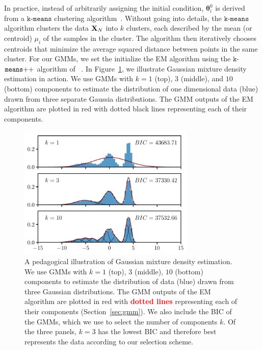 \documentclass[12pt, letterpaper, preprint]{aastex}
\newcommand{\todo}[1]{{\bf \textcolor{red}{#1}}}
\begin{document}
In practice, instead of arbitrarily assigning the initial condition, 
$\bm{\theta}^0_i$ is derived from a $\mathtt{k}$-$\mathtt{means}$ 
clustering algorithm~\citep{lloyd1982}. Without going into details, the 
$\mathtt{k}$-$\mathtt{means}$ algorithm clusters the data ${\bf X}_N$ into $k$ 
clusters, each described by the mean (or centroid) $\mu_i$ of the
samples in the cluster. The algorithm then iteratively chooses centroids that 
minimize the average squared distance between points in the same cluster.
For our GMMs, we set the initialize the EM algorithm using 
the $\mathtt{k}$-$\mathtt{means}{\tiny ++}$ algorithm of ~\cite{arthur2007}. 
In Figure~\ref{fig:gmm_ped}, we illustrate Gaussian mixture 
density estimation in action. We use GMMs with $k = 1$ (top), $
3$ (middle), and $10$ (bottom) components to estimate the
distribution of one dimensional data (blue) drawn from three 
separate Gaussia distributions. The GMM outputs of the EM algorithm 
are plotted in red with dotted black lines representing each of their 
components.  

\begin{figure}
\begin{center}
\includegraphics[width=0.75\textwidth]{figs/GMM_pedagog.pdf}
\caption{A pedagogical illustration of Gaussian mixture density estimation.
    We use GMMs with $k = 1$ (top), $3$ (middle), $10$ (bottom) 
    components to estimate the distribution of data (blue) drawn from three 
    Gaussian distributions. The GMM outputs of the EM algorithm 
    are plotted in red with \todo{dotted lines} representing each of their 
    components (Section~\ref{sec:gmm}). We also include the BIC of 
    the GMMs, which we use to select the number of components $k$. 
    Of the three panels, $k=3$ has the lowest BIC and therefore 
    best represents the data according to our selection scheme.} 
\label{fig:gmm_ped}
\end{center}
\end{figure}
\end{document}
